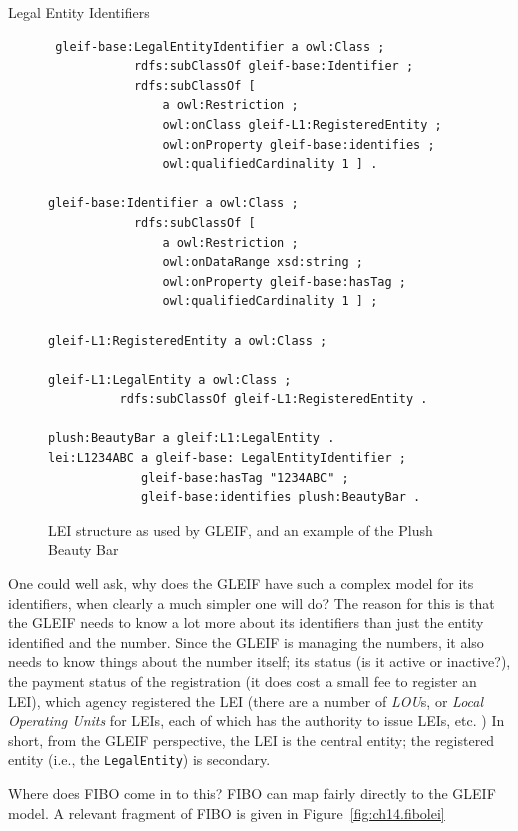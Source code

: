 \begin{challenge}{Legal Entity Identifiers}
\begin{figure}
 \begin{lstlisting}
 gleif-base:LegalEntityIdentifier a owl:Class ;
            rdfs:subClassOf gleif-base:Identifier ;
            rdfs:subClassOf [
                a owl:Restriction ;
                owl:onClass gleif-L1:RegisteredEntity ;
                owl:onProperty gleif-base:identifies ;
                owl:qualifiedCardinality 1 ] .
                
gleif-base:Identifier a owl:Class ;
            rdfs:subClassOf [
                a owl:Restriction ;
                owl:onDataRange xsd:string ;
                owl:onProperty gleif-base:hasTag ;
                owl:qualifiedCardinality 1 ] ;
                
gleif-L1:RegisteredEntity a owl:Class ;

gleif-L1:LegalEntity a owl:Class ;
          rdfs:subClassOf gleif-L1:RegisteredEntity .

plush:BeautyBar a gleif:L1:LegalEntity .
lei:L1234ABC a gleif-base: LegalEntityIdentifier ;
             gleif-base:hasTag "1234ABC" ;
             gleif-base:identifies plush:BeautyBar . 
 \end{lstlisting}
    \caption{LEI structure as used by GLEIF, and an example of the Plush Beauty Bar}
    \label{fig:ch14.gleifLEI}
\end{figure}

One could well ask, why does the GLEIF have such a complex model 
for its identifiers, when clearly a much simpler one will do? 
The reason for this is that the GLEIF needs to know a lot more 
about its identifiers than just the entity identified and the number.
Since the GLEIF is managing the numbers, it also needs to know 
things about the number itself; its status (is it active or inactive?), 
the payment status of the registration (it does cost a small 
fee to register an LEI), which agency registered the LEI (there are 
a number of \emph{LOU}s, or \emph{Local Operating Units} 
for LEIs, each of which has the authority to issue LEIs, etc. ) In short, 
from the GLEIF
perspective, the LEI is the central entity; the registered entity (i.e., the \texttt{LegalEntity}) is secondary. 
\end{challenge}


Where does FIBO come in to this?    FIBO can map fairly directly 
to the GLEIF model.  A relevant fragment of FIBO is given in 
Figure~\ref{fig:ch14.fibolei}

